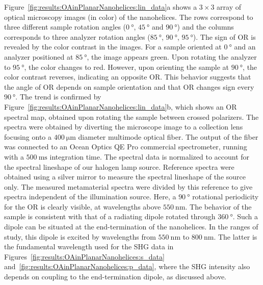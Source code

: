 Figure~\ref{fig:results:OAinPlanarNanohelices:lin_data}a shows a $3 \times 3$ array of optical microscopy images (in color) of the nanohelices. The rows correspond to three different sample rotation angles ($\SI{0}{\degree}$, $\SI{45}{\degree}$ and $\SI{90}{\degree}$) and the columns corresponds to three analyzer rotation angles ($\SI{85}{\degree}$, $\SI{90}{\degree}$, $\SI{95}{\degree}$).
The sign of OR is revealed by the color contrast in the images. For a sample oriented at $\SI{0}{\degree}$ and an analyzer positioned at $\SI{85}{\degree}$, the image appears green.
Upon rotating the analyzer to $\SI{95}{\degree}$, the color changes to red. However, upon orienting the sample at $\SI{90}{\degree}$, the color contrast reverses, indicating an opposite OR. This behavior suggests that the angle of OR depends on sample orientation and that OR changes sign every $\SI{90}{\degree}$. 
The trend is confirmed by Figure~\ref{fig:results:OAinPlanarNanohelices:lin_data}b, which shows an OR spectral map, obtained upon rotating the sample between crossed polarizers. 
The spectra were obtained by diverting the microscope image to a collection lens focusing onto a $\SI{400}{\micro\m}$ diameter multimode optical fiber. The output of the fiber was connected to an Ocean Optics QE Pro commercial spectrometer, running with a $\SI{500}{\milli\s}$ integration time. The spectral data is normalized to account for the spectral lineshape of our halogen lamp source. Reference spectra were obtained using a silver mirror to measure the spectral lineshape of the source only. The measured metamaterial spectra were divided by this reference to give spectra independent of the illumination source.
Here, a $\SI{90}{\degree}$ rotational periodicity for the OR is clearly visible, at wavelengths above $\SI{550}{\nano\m}$. The behavior of the sample is consistent with that of a radiating dipole rotated through $\SI{360}{\degree}$. Such a dipole can be situated at the end-termination of the nanohelices. In the ranges of study, this dipole is excited by wavelengths from $\SI{550}{\nano\m}$ to $\SI{800}{\nano\m}$. The latter is the fundamental wavelength used for the SHG data in Figures~\ref{fig:results:OAinPlanarNanohelices:s_data} and~\ref{fig:results:OAinPlanarNanohelices:p_data}, where the SHG intensity also depends on coupling to the end-termination dipole, as discussed above.

